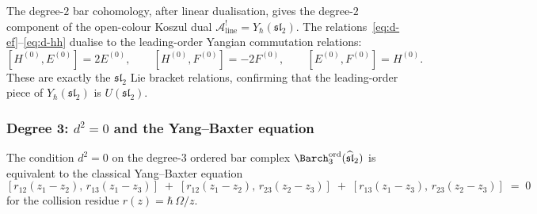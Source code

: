 \begin{remark}
The degree-$2$ bar cohomology, after linear dualisation, gives the
degree-$2$ component of the open-colour Koszul dual
$\mathcal A^!_{\mathrm{line}}=Y_\hbar(\mathfrak{sl}_2)$. The
relations~\eqref{eq:d-ef}--\eqref{eq:d-hh} dualise to the leading-order
Yangian commutation relations:
\[
[H^{(0)},E^{(0)}]=2E^{(0)},\qquad
[H^{(0)},F^{(0)}]=-2F^{(0)},\qquad
[E^{(0)},F^{(0)}]=H^{(0)}.
\]
These are exactly the $\mathfrak{sl}_2$ Lie bracket relations, confirming
that the leading-order piece of $Y_\hbar(\mathfrak{sl}_2)$ is
$U(\mathfrak{sl}_2)$.
\end{remark}

\subsubsection*{Degree 3: $d^2=0$ and the Yang--Baxter equation}

\begin{proposition}[$d^2=0$ is the classical Yang--Baxter equation;
\ClaimStatusProvedHere]
\label{prop:ybe-from-d-squared}
The condition $d^2=0$ on the degree-$3$ ordered bar complex
${\Barch}^{\mathrm{ord}}_3(\widehat{\mathfrak{sl}}_2)$ is equivalent to
the classical Yang--Baxter equation
\begin{equation}\label{eq:cybe-sl2}
[r_{12}(z_1{-}z_2),\,r_{13}(z_1{-}z_3)]
\;+\;
[r_{12}(z_1{-}z_2),\,r_{23}(z_2{-}z_3)]
\;+\;
[r_{13}(z_1{-}z_3),\,r_{23}(z_2{-}z_3)]
\;=\;0
\end{equation}
for the collision residue $r(z)=\hbar\,\Omega/z$.
\end{proposition}


